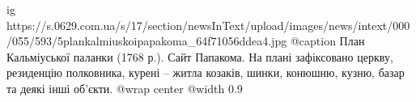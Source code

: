  
 
 
 
 

\ifcmt
  ig https://s.0629.com.ua/s/17/section/newsInText/upload/images/news/intext/000/055/593/5plankalmiuskoipapakoma_64f71056ddea4.jpg
  @caption План Кальміуської паланки (1768 р.). Сайт Папакома. На плані зафіксовано церкву, резиденцію полковника, курені – житла козаків, шинки, конюшню, кузню, базар та деякі інші об'єкти.
  @wrap center
  @width 0.9
\fi
